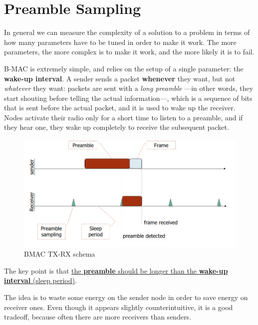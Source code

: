 \section{Preamble Sampling}
In general we can measure the complexity of a solution to a problem in terms of how many parameters have to be tuned in order to make it work.
The more parameters, the more complex is to make it work, and the more likely it is to fail.
\begin{paracol}{2}
   
   B-MAC is extremely simple, and relies on the setup of a single parameter: the \textbf{wake-up interval}.
   A sender sends a packet \textbf{whenever} they want, but not \textit{whatever} they want:
   packets are sent with a \textit{long preamble} ---in other words, they start shouting before telling the actual information---, which is a sequence of bits that is sent before the actual packet, and it is used to wake up the receiver.\\
   Nodes activate their radio only for a short time to listen to a preamble, and if they hear one, they wake up completely to receive the subsequent packet.

   \switchcolumn
   
   \begin{figure}[htbp]
      \centering
      \includegraphics{images/BMAC.png}
      \caption{BMAC TX-RX schema}
      \label{fig:BMAC}
   \end{figure}
\end{paracol}

\begin{center}
   The key point is that \ul{the \textbf{preamble} should be longer than the \textbf{wake-up interval} (sleep period)}.
\end{center}

The idea is to waste some energy on the sender node in order to save energy on receiver ones.
Even though it appears slightly counterintuitive, it is a good tradeoff, because often there are more receivers than senders.

